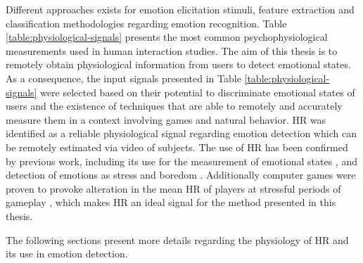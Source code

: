 Different approaches exists for emotion elicitation stimuli, feature extraction and classification methodologies regarding emotion recognition. Table \ref{table:physiological-signals} presents the most common psychophysiological measurements used in human interaction studies. The aim of this thesis is to remotely obtain physiological information from users to detect emotional states. As a consequence, the input signals presented in Table \ref{table:physiological-signals} were selected based on their potential to discriminate emotional states of users and the existence of techniques that are able to remotely and accurately measure them in a context involving games and natural behavior. HR was identified as a reliable physiological signal regarding emotion detection which can be remotely estimated via video of subjects. The use of HR has been confirmed by previous work, including its use for the measurement of emotional states \parencite{kivikangas2011review}, and detection of emotions as stress \parencite{choi2009using} and boredom \parencite{yamakoshi2007preliminary}. Additionally computer games were proven to provoke alteration in the mean HR of players at stressful periods of gameplay \parencite{sharma2006assessment,rodriguez2015vr}, which makes HR an ideal signal for the method presented in this thesis.

The following sections present more details regarding the physiology of HR and its use in emotion detection.



